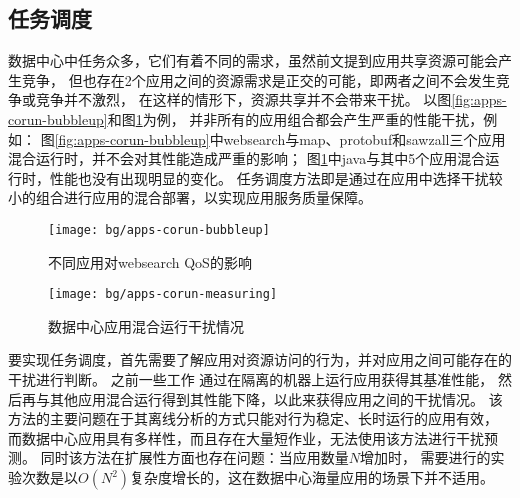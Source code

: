 \subsection{任务调度}

数据中心中任务众多，它们有着不同的需求，虽然前文提到应用共享资源可能会产生竞争，
但也存在2个应用之间的资源需求是正交的可能，即两者之间不会发生竞争或竞争并不激烈，
在这样的情形下，资源共享并不会带来干扰。
以图\ref{fig:apps-corun-bubbleup}和图\ref{fig:apps-corun-measuring}为例，
并非所有的应用组合都会产生严重的性能干扰，例如：
图\ref{fig:apps-corun-bubbleup}中websearch与map、protobuf和sawzall三个应用混合运行时，并不会对其性能造成严重的影响；
图\ref{fig:apps-corun-measuring}中java与其中5个应用混合运行时，性能也没有出现明显的变化。
任务调度方法即是通过在应用中选择干扰较小的组合进行应用的混合部署，以实现应用服务质量保障。

\begin{figure}[tb]
\begin{minipage}[b]{0.48\textwidth}
  \centering
  \texttt{[image: bg/apps-corun-bubbleup]}
  \caption{不同应用对websearch QoS的影响\cite{mars_bubble-up:_2011}}
  \label{fig:apps-corun-bubbleup}
\end{minipage}\hfill
\begin{minipage}[b]{0.48\textwidth}
  \centering
  \texttt{[image: bg/apps-corun-measuring]}
  \caption{数据中心应用混合运行干扰情况\cite{kambadur_measuring_2012}}
  \label{fig:apps-corun-measuring}
\end{minipage}
\end{figure}

要实现任务调度，首先需要了解应用对资源访问的行为，并对应用之间可能存在的干扰进行判断。
之前一些工作\cite{Blagodurov:2010, Chiang:2011, herdrich_rate-based_2009, Jiang:2008,
Kim:2004, mars_contention_2010, Nathuji:2010, Tang:2011}
通过在隔离的机器上运行应用获得其基准性能，
然后再与其他应用混合运行得到其性能下降，以此来获得应用之间的干扰情况。
该方法的主要问题在于其离线分析的方式只能对行为稳定、长时运行的应用有效，
而数据中心应用具有多样性，而且存在大量短作业，无法使用该方法进行干扰预测。
同时该方法在扩展性方面也存在问题：当应用数量$N$增加时，
需要进行的实验次数是以$O(N^2)$复杂度增长的，这在数据中心海量应用的场景下并不适用。

